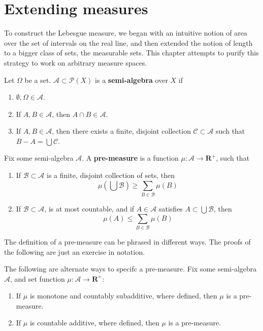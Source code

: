 \chapter{Extending measures}

To construct the Lebesgue measure, we began with an intuitive notion of area over the set of intervals on the real line, and then extended the notion of length to a bigger class of sets, the measurable sets. This chapter attempts to purify this strategy to work on arbitrary measure spaces.

\begin{definition}
    Let $\Omega$ be a set. $\mathcal{A} \subset \mathcal{P}(X)$ is a {\bf semi-algebra} over $X$ if
    \begin{enumerate}
        \item $\emptyset, \Omega \in \mathcal{A}$.
        \item If $A,B \in \mathcal{A}$, then $A \cap B \in \mathcal{A}$.
        \item If $A,B \in \mathcal{A}$, then there exists a finite, disjoint collection $\mathcal{C} \subset \mathcal{A}$ such that $B - A = \bigcup \mathcal{C}$.
    \end{enumerate}
\end{definition}

\begin{definition}
    Fix some semi-algebra $\mathcal{A}$. A {\bf pre-measure} is a function $\mu:\mathcal{A} \to \mathbf{R}^+$, such that
    \begin{enumerate}
        \item If $\mathcal{B} \subset \mathcal{A}$ is a finite, disjoint collection of sets, then
        \[ \mu \left(\bigcup \mathcal{B} \right) \geq \sum_{B \in \mathcal{B}} \mu(B) \]
        \item If $\mathcal{B} \subset \mathcal{A}$, is at most countable, and if $A \in \mathcal{A}$ satisfies $A \subset \bigcup \mathcal{B}$, then
        \[ \mu(A) \leq \sum_{B \in \mathcal{B}} \mu(B) \]
    \end{enumerate}
\end{definition}

The definition of a pre-measure can be phrased in different ways. The proofs of the following are just an exercise in notation.

\begin{lemma}
    The following are alternate ways to specifc a pre-measure. Fix some semi-algebra $\mathcal{A}$, and set function $\mu:\mathcal{A} \to \mathbf{R}^+$:
    \begin{enumerate}
        \item If $\mu$ is monotone and countably subadditive, where defined, then $\mu$ is a pre-measure.
        \item If $\mu$ is countable additive, where defined, then $\mu$ is a pre-measure.
    \end{enumerate}
\end{lemma}

